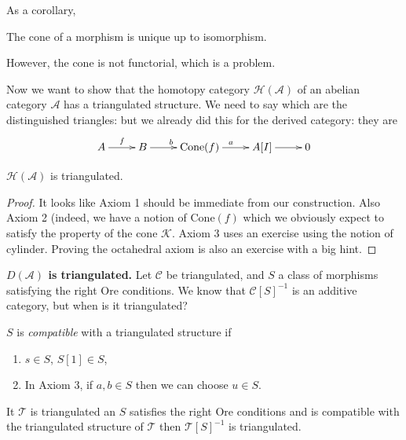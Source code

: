 As a corollary,

\begin{lemma}
\label{lemma-cone-of-morphism-is-unique}
The cone of a morphism is unique up to isomorphism.
\end{lemma}

However, the cone is not functorial, which is a problem.

\medskip\noindent
Now we want to show that the homotopy category $\mathcal{H}(\mathcal{A})$ of an
abelian category $\mathcal{A}$ has a triangulated structure. 
We need to say which are the distinguished triangles: but we already did this
for the derived category: they are
$$
\xymatrix{
A\ar[r]^f&B\ar[r]^b&\text{Cone}(f)\ar[r]^a&A[I]\ar[r]&0
}
$$

\begin{theorem}
\label{theorem-homotopy-category-is-triangulated}
$\mathcal{H}(\mathcal{A})$ is triangulated.
\end{theorem}

\begin{proof}
It looks like Axiom 1 should be immediate from our construction. Also Axiom 2
(indeed, we have a notion of $\text{Cone}(f)$ which we obviously expect to
satisfy the property of the cone $\mathcal{K}$. Axiom 3 uses an exercise using
the notion of cylinder. Proving the octahedral axiom is also an exercise with a
big hint.
\end{proof}

{\bf $D(\mathcal{A})$ is triangulated.} Let $\mathcal{C}$ be triangulated, and
$S$ a class of morphisms satisfying the right Ore conditions. We know that
$\mathcal{C}[S]^{-1}$ is an additive category, but when is it triangulated?

\begin{definition}
\label{definition-compatible-class-of-morphisms}
$S$ is {\it compatible} with a triangulated structure if
\begin{enumerate}
\item $s \in S$, $S[1]\in S$,
\item In Axiom 3, if $a,b \in S$ then we can choose $u \in S$.
\end{enumerate}
\end{definition}

\begin{proposition}
\label{proposition-compatible-class-gives-triangulated-localization}
It $\mathcal{T}$ is triangulated an $S$ satisfies the right Ore conditions and
is compatible with the triangulated structure of $\mathcal{T}$ then
$\mathcal{T}[S]^{-1}$ is triangulated.
\end{proposition}

